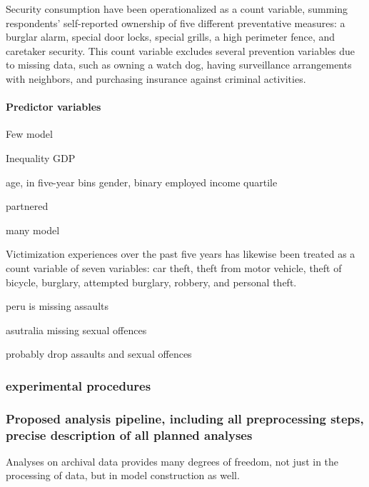 \documentclass[
  english,
  man]{apa6}
\let\oldparagraph\paragraph
\renewcommand{\paragraph}[1]{\oldparagraph{#1}\mbox{}}
\begin{document}
Security consumption have been operationalized as a count variable, summing respondents' self-reported ownership of five different preventative measures: a burglar alarm, special door locks, special grills, a high perimeter fence, and caretaker security. This count variable excludes several prevention variables due to missing data, such as owning a watch dog, having surveillance arrangements with neighbors, and purchasing insurance against criminal activities.

\hypertarget{predictor-variables}{%
\paragraph{Predictor variables}\label{predictor-variables}}

Few model

Inequality GDP

age, in five-year bins gender, binary employed income quartile

partnered

many model

Victimization experiences over the past five years has likewise been treated as a count variable of seven variables: car theft, theft from motor vehicle, theft of bicycle, burglary, attempted burglary, robbery, and personal theft.

peru is missing assaults

asutralia missing sexual offences

probably drop assaults and sexual offences

\hypertarget{experimental-procedures}{%
\subsubsection{experimental procedures}\label{experimental-procedures}}

\hypertarget{proposed-analysis-pipeline-including-all-preprocessing-steps-precise-description-of-all-planned-analyses}{%
\subsubsection{Proposed analysis pipeline, including all preprocessing steps, precise description of all planned analyses}\label{proposed-analysis-pipeline-including-all-preprocessing-steps-precise-description-of-all-planned-analyses}}

Analyses on archival data provides many degrees of freedom, not just in the processing of data, but in model construction as well.
\end{document}
